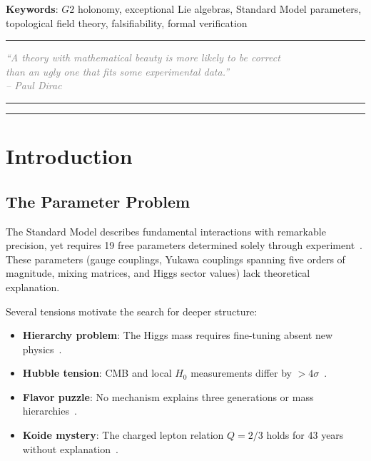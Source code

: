 \documentclass[11pt,a4paper]{article}
\newcommand{\Gtwo}{\mathrm{G}_2}
\def\Gtwo{G2}%
\begin{document}
\noindent\textbf{Keywords}: $\Gtwo$ holonomy, exceptional Lie algebras, Standard Model parameters, topological field theory, falsifiability, formal verification

\vfill
\noindent\rule{\textwidth}{0.2pt}
\begin{flushright}
\textit{\textcolor{gray}{``A theory with mathematical beauty is more likely to be correct\\
than an ugly one that fits some experimental data.''\\
-- Paul Dirac}}
\end{flushright}

\newpage
\tableofcontents

\noindent\rule{\textwidth}{0.2pt}

\vfill

\noindent\rule{\textwidth}{0.2pt}

\section{Introduction}

\subsection{The Parameter Problem}

The Standard Model describes fundamental interactions with remarkable precision, yet requires 19 free parameters determined solely through experiment~\cite{pdg2024}. These parameters (gauge couplings, Yukawa couplings spanning five orders of magnitude, mixing matrices, and Higgs sector values) lack theoretical explanation.

Several tensions motivate the search for deeper structure:

\begin{itemize}
\item \textbf{Hierarchy problem}: The Higgs mass requires fine-tuning absent new physics~\cite{weinberg1976}.
\item \textbf{Hubble tension}: CMB and local $H_0$ measurements differ by $>4\sigma$~\cite{planck2020,riess2022}.
\item \textbf{Flavor puzzle}: No mechanism explains three generations or mass hierarchies~\cite{froggatt1979}.
\item \textbf{Koide mystery}: The charged lepton relation $Q = 2/3$ holds for 43 years without explanation~\cite{koide1982}.
\end{itemize}
\end{document}
